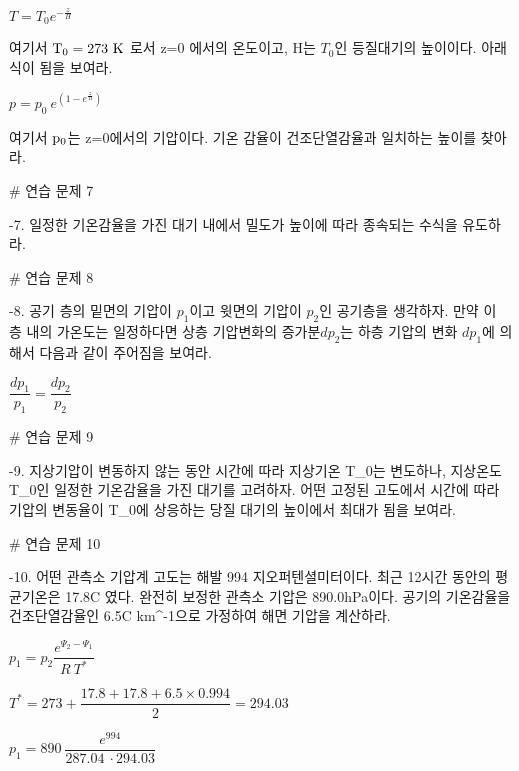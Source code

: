 $ T = T_{0} e^{-\frac{z}{H}}$

여기서 $\rm T_{0} = 273~K$ 로서 z=0 에서의 온도이고, H는 $ T_{0}$인 등질대기의 높이이다. 아래 식이 됨을 보여라.

$ p = p_{0}~ e^{(1-e^{\frac{z}{H}})}$

여기서 $\rm p_{0}$는 z=0에서의 기압이다. 기온 감율이 건조단열감율과 일치하는 높이를 찾아라.



# 연습 문제 7

-7. 일정한 기온감율을 가진 대기 내에서 밀도가 높이에 따라 종속되는 수식을 유도하라.




# 연습 문제 8


-8. 공기 층의 밑면의 기압이 $p_1$이고 윗면의 기압이 $p_2$인 공기층을 생각하자. 만약 이 층 내의 가온도는 일정하다면 상층 기압변화의 증가분$dp_2$는 하층 기압의 변화 $dp_1$에 의해서 다음과 같이 주어짐을 보여라.

$ \dfrac{dp_1}{p_1} =  \dfrac{dp_2}{p_2}$




# 연습 문제 9


-9. 지상기압이 변동하지 않는 동안 시간에 따라 지상기온 T_0는 변도하나, 지상온도 T_0인 일정한 기온감율을 가진 대기를 고려하자. 어떤 고정된 고도에서 시간에 따라 기압의 변동율이 T_0에 상응하는 당질 대기의 높이에서 최대가 됨을 보여라.



# 연습 문제 10


-10. 어떤 관측소 기압계 고도는 해발 994 지오퍼텐셜미터이다. 최근 12시간 동안의 평균기온은 17.8C 였다. 완전히 보정한 관측소 기압은 890.0hPa이다. 공기의 기온감율을 건조단열감율인 6.5C km^{-1}으로 가정하여 해면 기압을 계산하라.

$p_{1} = p_{2} \dfrac{e^{\Psi_2 - \Psi_1}}{R~T^{*}}$

$ T^{*} = 273 + \dfrac{17.8 + 17.8 + 6.5 \times 0.994}{2} = 294.03$

$p_{1} = 890 ~\dfrac{e^{994}}{287.04~\cdot 294.03}$